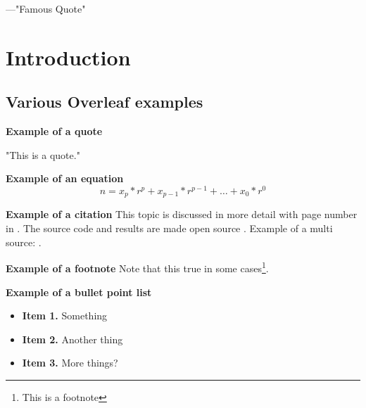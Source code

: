 \begin{savequote}
---"Famous Quote"
\end{savequote}

\chapter{Introduction}
\label{ch:intro}

\section{Various Overleaf examples}

\textbf{Example of a quote}
\begin{displayquote}
"This is a quote."
\end{displayquote}

\textbf{Example of an equation}
\begin{equation} \label{eq:1}
n = x_{p} * r^{p} + x_{p-1} * r^{p-1} + \dots + x_{0} * r^{0}
\end{equation}

\textbf{Example of a citation}
This topic is discussed in more detail with page number in \cite[p.~3]{BosBeyondCMOS}. The source code and results are made open source \cite{bos-mrcsGithub}. Example of a multi source: \cite{RineMVLbook,BosBeyondCMOS,bos-mrcsGithub}.

\textbf{Example of a footnote}
Note that this true in some cases\footnote{This is a footnote}. 

\textbf{Example of a bullet point list}
\begin{itemize}
    \item \textbf{Item 1.} Something
    \item \textbf{Item 2.} Another thing
    \item \textbf{Item 3.} More things?
\end{itemize}

